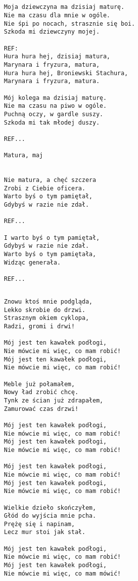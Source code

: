 \documentclass[12pt]{article}
\begin{document}
\subsection*{}
\begin{verbatim}
Moja dziewczyna ma dzisiaj maturę.
Nie ma czasu dla mnie w ogóle.
Nie śpi po nocach, strasznie się boi.
Szkoda mi dziewczyny mojej.

REF:
Hura hura hej, dzisiaj matura,
Marynara i fryzura, matura,
Hura hura hej, Broniewski Stachura,
Marynara i fryzura, matura.

Mój kolega ma dzisiaj maturę.
Nie ma czasu na piwo w ogóle.
Puchną oczy, w gardle suszy.
Szkoda mi tak młodej duszy.

REF...

Matura, maj


Nie matura, a chęć szczera
Zrobi z Ciebie oficera.
Warto byś o tym pamiętał,
Gdybyś w razie nie zdał.

REF...

I warto byś o tym pamiętał,
Gdybyś w razie nie zdał.
Warto byś o tym pamiętała,
Widząc generała.

REF...
\end{verbatim}
\clearpage

\subsection*{}
\begin{verbatim}
Znowu ktoś mnie podgląda,
Lekko skrobie do drzwi.
Strasznym okiem cyklopa,
Radzi, gromi i drwi!

Mój jest ten kawałek podłogi,
Nie mówcie mi więc, co mam robić!
Mój jest ten kawałek podłogi,
Nie mówcie mi więc, co mam robić!

Meble już połamałem,
Nowy ład zrobić chcę.
Tynk ze ścian już zdrapałem,
Zamurować czas drzwi!

Mój jest ten kawałek podłogi,
Nie mówcie mi więc, co mam robić!
Mój jest ten kawałek podłogi,
Nie mówcie mi więc, co mam robić!

Mój jest ten kawałek podłogi,
Nie mówcie mi więc, co mam robić!
Mój jest ten kawałek podłogi,
Nie mówcie mi więc, co mam robić!

Wielkie dzieło skończyłem,
Głód do wyjścia mnie pcha.
Prężę się i napinam,
Lecz mur stoi jak stał.

Mój jest ten kawałek podłogi,
Nie mówcie mi więc, co mam robić!
Mój jest ten kawałek podłogi,
Nie mówcie mi więc, co mam mówić!
\end{verbatim}
\clearpage
\end{document}
